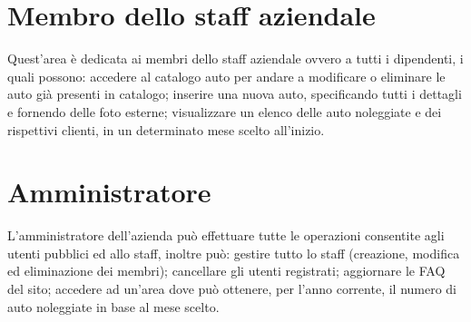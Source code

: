 \documentclass[12pt,a4paperS]{report}
\begin{document}
\begin{normalsize}
			\section{Membro dello staff aziendale}
				Quest'area è dedicata ai membri dello staff aziendale ovvero a tutti i dipendenti, i quali possono: accedere al catalogo auto per andare a modificare o eliminare le auto già presenti in catalogo; inserire una nuova auto, specificando tutti i dettagli e fornendo delle foto esterne; visualizzare un elenco delle auto noleggiate e dei rispettivi clienti, in un determinato mese scelto all'inizio.
			
			\section{Amministratore}
				L'amministratore dell'azienda può effettuare tutte le operazioni consentite agli utenti pubblici ed allo staff, inoltre può: gestire tutto lo staff (creazione, modifica ed eliminazione dei membri); cancellare gli utenti registrati; aggiornare le FAQ del sito; accedere ad un'area dove può ottenere, per l'anno corrente, il numero di auto noleggiate in base al mese scelto.
		\end{normalsize}
		
\end{document}

